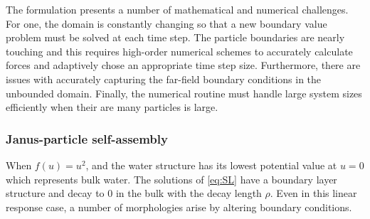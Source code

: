 
The formulation presents a number of mathematical and numerical
challenges. For one, the domain is constantly changing so that a new
boundary value problem must be solved at each time step.  The particle
boundaries are nearly touching and this requires high-order numerical
schemes to accurately calculate forces and adaptively chose an
appropriate time step size. Furthermore, there are issues with
accurately capturing the far-field boundary conditions in the unbounded
domain. Finally, the numerical routine must handle large system sizes
efficiently when their are many particles is large. 


\subsubsection{Janus-particle self-assembly} 
When $f(u) = u^2$, and the water structure has its lowest potential
value at $u=0$ which represents bulk water. The solutions of
\eqref{eq:SL} have a boundary layer structure and decay to $0$ in the
bulk with the decay length $\rho$. Even in this linear response case, a
number of morphologies arise by altering boundary conditions.

